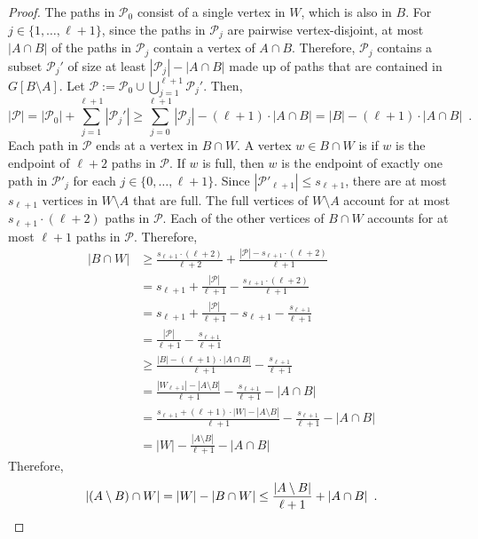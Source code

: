 \documentclass{patmorin}
\begin{document}
\begin{proof}
  The paths in $\mathcal{P}_0$ consist of a single vertex in $W$, which is also in $B$.
  For $j\in\{1,\ldots,\ell+1\}$, since the paths in $\mathcal{P}_j$ are pairwise vertex-disjoint, at most $|A\cap B|$ of the paths in $\mathcal{P}_j$ contain a vertex of $A\cap B$.  Therefore, $\mathcal{P}_j$ contains a subset $\mathcal{P}_j'$ of size at least $|\mathcal{P}_j|-|A\cap B|$ made up of paths that are contained in $G[B\setminus A]$.  Let $\mathcal{P}:=\mathcal{P}_0\cup \bigcup_{j=1}^{\ell+1} \mathcal{P}_j'$. Then,
  \[
    |\mathcal{P}|=|\mathcal{P}_0|+\sum_{j=1}^{\ell+1}|\mathcal{P}_j'| \ge \sum_{j=0}^{\ell+1}|\mathcal{P}_j| - (\ell+1)\cdot|A\cap B|
    = |B|-(\ell+1)\cdot|A\cap B| \enspace .
  \]
  Each path in $\mathcal{P}$ ends at a vertex in $B\cap W$.  A vertex $w\in B\cap W$ is  if $w$ is the endpoint of $\ell+2$ paths in $\mathcal{P}$.  If $w$ is full, then $w$ is the endpoint of exactly one path in $\mathcal{P}'_j$ for each $j\in\{0,\ldots,\ell+1\}$.  Since $|\mathcal{P}'_{\ell+1}|\le s_{\ell+1}$, there are at most $s_{\ell+1}$ vertices in $W\setminus A$ that are full.  The full vertices of $W\setminus A$ account for at most $s_{\ell+1}\cdot (\ell+2)$ paths in $\mathcal{P}$. Each of the other vertices of $B\cap W$ accounts for at most $\ell+1$ paths in $\mathcal{P}$.  Therefore,
  \begin{align*}
     |B\cap W|
     & \ge \frac{s_{\ell+1}\cdot (\ell+2)}{\ell+2} + \frac{|\mathcal{P}|-s_{\ell+1}\cdot(\ell+2)}{\ell+1} \\
     & = s_{\ell+1} + \frac{|\mathcal{P}|}{\ell+1}-\frac{s_{\ell+1}\cdot(\ell+2)}{\ell+1} \\
     & = s_{\ell+1} + \frac{|\mathcal{P}|}{\ell+1}-s_{\ell+1}
     - \frac{s_{\ell+1}}{\ell+1}\\
     & = \frac{|\mathcal{P}|}{\ell+1}
     - \frac{s_{\ell+1}}{\ell+1}\\
     & \ge \frac{|B|-(\ell+1)\cdot|A\cap B|}{\ell+1}
     - \frac{s_{\ell+1}}{\ell+1}\\
     & = \frac{|W_{\ell+1}|-|A\setminus B|}{\ell+1}
     - \frac{s_{\ell+1}}{\ell+1} - |A\cap B|\\
     & = \frac{s_{\ell+1}+(\ell+1)\cdot|W|-|A\setminus B|}{\ell+1}
     - \frac{s_{\ell+1}}{\ell+1} - |A\cap B|\\
     & = |W|-\frac{|A\setminus B|}{\ell+1}-|A\cap B|
  \end{align*}
  Therefore,
  \[
    |(A\setminus B)\cap W|=|W|-|B\cap W|\le \frac{|A\setminus B|}{\ell+1}+ |A\cap B| \enspace . \qedhere
  \]
\end{proof}
\end{document}

